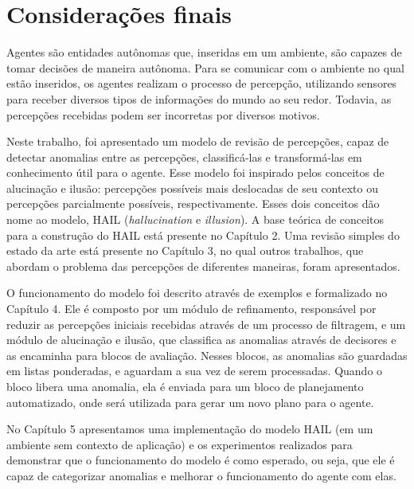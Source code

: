 \chapter{Considerações finais}

Agentes são entidades autônomas que, inseridas em um ambiente, são capazes de tomar decisões de maneira autônoma. Para se comunicar com o ambiente no qual estão inseridos, os agentes realizam o processo de percepção, utilizando sensores para receber diversos tipos de informações do mundo ao seu redor. Todavia, as percepções recebidas podem ser incorretas por diversos motivos.

Neste trabalho, foi apresentado um modelo de revisão de percepções, capaz de detectar anomalias entre as percepções, classificá-las e transformá-las em conhecimento útil para o agente. Esse modelo foi inspirado pelos conceitos de alucinação e ilusão: percepções possíveis mais deslocadas de seu contexto ou percepções parcialmente possíveis, respectivamente. Esses dois conceitos dão nome ao modelo, HAIL (\textit{hallucination} e \textit{illusion}). A base teórica de conceitos para a construção do HAIL está presente no Capítulo 2. Uma revisão simples do estado da arte está presente no Capítulo 3, no qual outros trabalhos, que abordam o problema das percepções de diferentes maneiras, foram apresentados.

O funcionamento do modelo foi descrito através de exemplos e formalizado no Capítulo 4. Ele é composto por um módulo de refinamento, responsável por reduzir as percepções iniciais recebidas através de um processo de filtragem, e um módulo de alucinação e ilusão, que classifica as anomalias através de decisores e as encaminha para blocos de avaliação. Nesses blocos, as anomalias são guardadas em listas ponderadas, e aguardam a sua vez de serem processadas. Quando o bloco libera uma anomalia, ela é enviada para um bloco de planejamento automatizado, onde será utilizada para gerar um novo plano para o agente.

No Capítulo 5 apresentamos uma implementação do modelo HAIL (em um ambiente sem contexto de aplicação) e os experimentos realizados para demonstrar que o funcionamento do modelo é como esperado, ou seja, que ele é capaz de categorizar anomalias e melhorar o funcionamento do agente com elas. 


